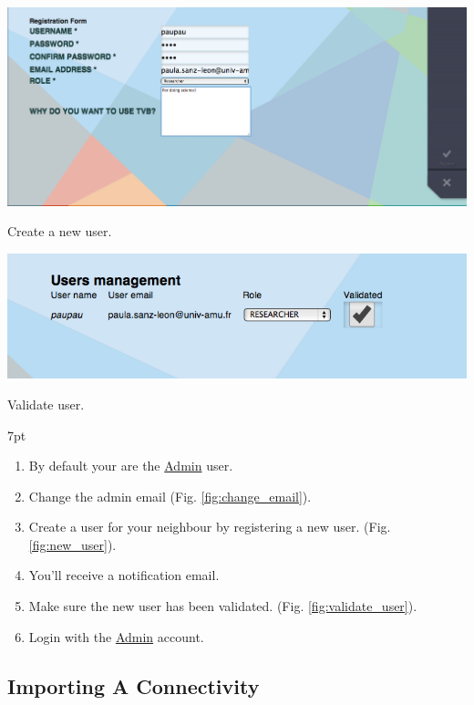 \documentclass{tufte-handout}
\newenvironment{formal}{%
  \def\FrameCommand{%
    \hspace{1pt}%
    {\color{DarkBlue}\vrule width 2pt}%
    {\color{formalshade}\vrule width 4pt}%
    \colorbox{formalshade}%
  }%
  \MakeFramed{\advance\hsize-\width\FrameRestore}%
  \noindent\hspace{-4.55pt}%
  \begin{adjustwidth}{}{7pt}%
  \vspace{2pt}\vspace{2pt}%
}
{%
  \vspace{2pt}\end{adjustwidth}\endMakeFramed%
}
\begin{document}
\begin{marginfigure}
  \includegraphics[width=\linewidth]{Handout_UI_LinkAndShare_AddNewUser}%
  \caption{Create a new user.}%
  \label{fig:new_user}%
\end{marginfigure}

\begin{marginfigure}
  \includegraphics[width=\linewidth]{Handout_UI_LinkAndShare_ValidateNewUser}%
  \caption{Validate user.}%
  \label{fig:validate_user}%
\end{marginfigure}

\begin{formal}
\begin{enumerate}
\item By default your are the \underline{Admin} user. 
\item Change the admin email (Fig. \ref{fig:change_email}).
\item Create a user for your neighbour by registering a new user. (Fig. \ref{fig:new_user}). 
\item You'll receive a notification email.
\item Make sure the new user has been validated. (Fig. \ref{fig:validate_user}).
\item Login with the \underline{Admin} account. 
\end{enumerate}
\end{formal}

\subsection{Importing A Connectivity}\label{sec:import_connectivity}
\end{document}
